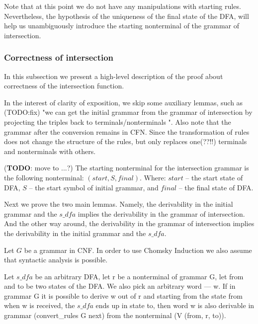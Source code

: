 Note that at this point we do not have any manipulations with starting rules. Nevertheless, the hypothesis of the uniqueness of the final state of the DFA, will help us unambiguously introduce the starting nonterminal of the grammar of intersection.

\subsubsection{Correctness of intersection}

In this subsection we present a high-level description of the proof about correctness of the intersection function.

In the interest of clarity of exposition, we skip some auxiliary lemmas, such as (TODO:fix) "we can get the initial grammar from the grammar of intersection by projecting the triples back to terminals/nonterminals ". Also note that the grammar after the conversion remains in CFN. Since the transformation of rules does not change the structure of the rules, but only replaces one(??!!) terminals and nonterminals with others.


(\textbf{TODO}: move to ...?)
The starting nonterminal for the intersection grammar is the following nonterminal: $(start, S, final)$. 
Where: $start$ -- the start state of DFA, $S$ -- the start symbol of initial grammar, and $final$ -- the final state of DFA. 


Next we prove the two main lemmas. Namely, the derivability in the initial grammar and the $s\_dfa$ implies the derivability in the grammar of intersection. And the other way around, the derivability in the grammar of intersection implies the derivability in the initial grammar and the $s\_dfa$.

Let $G$ be a grammar in CNF. In order to use Chomsky Induction we also assume that syntactic analysis is possible. 


\begin{theorem}
    Let $s\_dfa$ be an arbitrary DFA, let r be a nonterminal of grammar G, let from and to be two states of the DFA. We also pick an arbitrary word --- w. If in grammar G it is possible to derive w out of r and starting from the state from when w is received, the $s\_dfa$ ends up in state to, then word w is also derivable in grammar (convert\_rules G next) from the nonterminal (V (from, r, to)).
\end{theorem}

